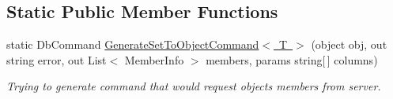 \subsection*{Static Public Member Functions}
\begin{DoxyCompactItemize}
\item 
static Db\+Command \mbox{\hyperlink{class_uniform_data_operator_1_1_sql_1_1_my_sql_1_1_my_sql_data_operator_a62557a54a6ac875bbc3ea0b934190224}{Generate\+Set\+To\+Object\+Command$<$ T $>$}} (object obj, out string error, out List$<$ Member\+Info $>$ members, params string\mbox{[}$\,$\mbox{]} columns)
\begin{DoxyCompactList}\small\item\em Trying to generate command that would request objects members from server. \end{DoxyCompactList}\end{DoxyCompactItemize}
